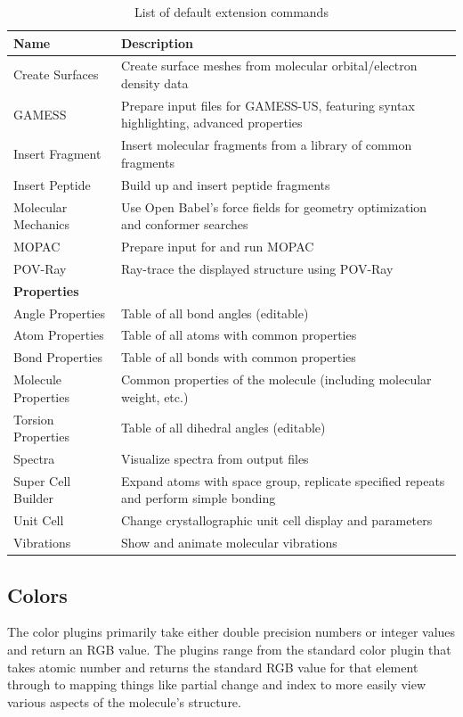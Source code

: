 \documentclass[10pt]{bmc_article}
\newenvironment{bmcformat}{\begin{raggedright}
\baselineskip20pt\sloppy\setboolean{publ}{false}}{\end{raggedright}
\baselineskip20pt\sloppy}
\begin{document}
\begin{bmcformat}
\begin{table}
  \caption{List of default extension commands}
  \label{extension-table}
\begin{tabular}{l | l}
\hline
Name & Description \\
\hline
Create Surfaces & Create surface meshes from molecular orbital/electron density data \\
GAMESS & Prepare input files for GAMESS-US, featuring syntax highlighting, advanced properties \\
Insert Fragment & Insert molecular fragments from a library of common fragments \\
Insert Peptide & Build up and insert peptide fragments \\
Molecular Mechanics & Use Open Babel's force fields for geometry optimization and conformer searches \\
MOPAC & Prepare input for and run MOPAC  \\
POV-Ray & Ray-trace the displayed structure using POV-Ray \\
\textbf{Properties} \\
Angle Properties & Table of all bond angles (editable)\\
Atom Properties & Table of all atoms with common properties \\
Bond Properties & Table of all bonds with common properties \\
Molecule Properties & Common properties of the molecule (including
molecular weight, etc.)\\
Torsion Properties & Table of all dihedral angles (editable) \\
Spectra & Visualize spectra from output files \\
Super Cell Builder & Expand atoms with space group, replicate specified repeats and perform simple bonding \\
Unit Cell & Change crystallographic unit cell display and parameters \\
Vibrations & Show and animate molecular vibrations \\
\hline
\end{tabular}
\end{table}

\subsection{Colors}

The color plugins primarily take either double precision numbers or integer
values and return an RGB value. The plugins range from the standard color
plugin that takes atomic number and returns the standard RGB value for that
element through to mapping things like partial change and index to more easily
view various aspects of the molecule's structure.


\end{bmcformat}
\end{document}
